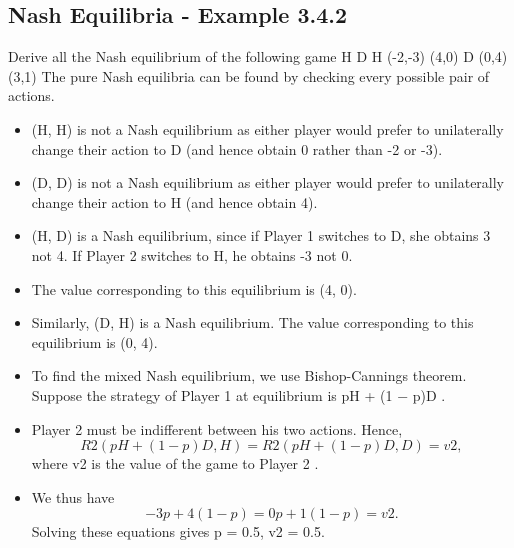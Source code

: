 \documentclass[]{report}
\begin{document}
	\subsection{Nash Equilibria - Example 3.4.2}
	Derive all the Nash equilibrium of the following game
	H D
	H (-2,-3) (4,0)
	D (0,4) (3,1)
	The pure Nash equilibria can be found by checking every possible
	pair of actions.
	\begin{itemize}
		\item (H, H) is not a Nash equilibrium as either player would prefer to
		unilaterally change their action to D (and hence obtain 0 rather
		than -2 or -3).
		\item (D, D) is not a Nash equilibrium as either player would prefer to
		unilaterally change their action to H (and hence obtain 4).
		\item (H, D) is a Nash equilibrium, since if Player 1 switches to D, she
		obtains 3 not 4. If Player 2 switches to H, he obtains -3 not 0.
		\item	The value corresponding to this equilibrium is (4, 0).
		\item	Similarly, (D, H) is a Nash equilibrium. The value corresponding to
		this equilibrium is (0, 4).
	\end{itemize}
	
	\begin{itemize}
		\item To find the mixed Nash equilibrium, we use Bishop-Cannings
		theorem. Suppose the strategy of Player 1 at equilibrium is
		pH + (1 − p)D . 	\item Player 2 must be indifferent between his two
		actions. Hence,
		\[R2(pH + (1 − p)D, H) = R2(pH + (1 − p)D, D) = v2,\]
		where v2 is the value of the game to Player 2 .
		\item We thus have \[−3p + 4(1 − p) = 0p + 1(1 − p) = v2.\] Solving these
		equations gives p = 0.5, v2 = 0.5.
	\end{itemize}
	
\end{document}

